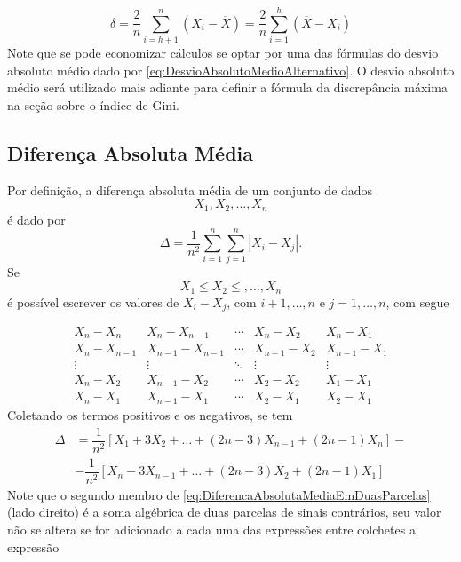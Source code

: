 \documentclass[
]{book}
\begin{document}
\[
  \delta = \dfrac{2}{n} \sum_ {i=h+1}^{n}\left( X_i - \overline{X} \right) = \dfrac{2}{n} \sum_ {i=1}^{h} \left( \overline{X} - X_i  \right)
\label{eq:DesvioAbsolutoMedioAlternativo}
\]
Note que se pode economizar cálculos se optar por uma das fórmulas do desvio absoluto médio dado por \eqref{eq:DesvioAbsolutoMedioAlternativo}. O desvio absoluto médio será utilizado mais adiante para definir a fórmula da discrepância máxima na seção sobre o índice de Gini.

\hypertarget{diferenuxe7a-absoluta-muxe9dia}{%
\subsection{Diferença Absoluta Média}\label{diferenuxe7a-absoluta-muxe9dia}}

Por definição, a diferença absoluta média de um conjunto de dados
\[
X_1, X_2, \ldots, X_n
\]
é dado por
\[
\Delta = \dfrac{1}{n^2} \sum_{i=1}^{n} \sum_{j=1}^{n} \left| X_i - X_j \right|.
\label{eq:DiferencaAbsolutaMedia}
\]
Se
\[
X_1 \leq X_2 \leq , \ldots, X_n
\]
é possível escrever os valores de \(X_i -X_j\), com \(i+1,\ldots, n\) e \(j=1,\ldots,n\), com segue

\[
  \begin{array}{ccccc}
    X_n - X_n         & X_n - X_{n-1}         & \cdots    & X_n - X_2       & X_n - X_1 \\
    X_n - X_{n-1}     & X_{n-1} - X_{n-1}     & \cdots    & X_{n-1} - X_2   & X_{n-1} - X_1 \\
    \vdots            & \vdots                & \ddots    & \vdots          & \vdots \\
    X_n - X_2         & X_{n-1} - X_2         & \cdots    & X_2 - X_2       & X_1 - X_1 \\
    X_n - X_1         & X_{n-1} - X_1         & \cdots    & X_2 - X_1       & X_2 - X_1 
  \end{array}
\]
Coletando os termos positivos e os negativos, se tem
\[
  \begin{split}
    \Delta    & = \dfrac{1}{n^2} \left[ X_1 + 3X_2 + \ldots + (2n - 3)X_{n-1} + (2n-1)X_n \right] -  \\
              & - \dfrac{1}{n^2}\left[ X_n - 3X_{n-1} + \ldots + (2n - 3)X_2 + (2n -1)X_1 \right]
  \end{split}
\label{eq:DiferencaAbsolutaMediaEmDuasParcelas}
\]
Note que o segundo membro de \eqref{eq:DiferencaAbsolutaMediaEmDuasParcelas} (lado direito) é a soma algébrica de duas parcelas de sinais contrários, seu valor não se altera se for adicionado a cada uma das expressões entre colchetes a expressão
\end{document}
